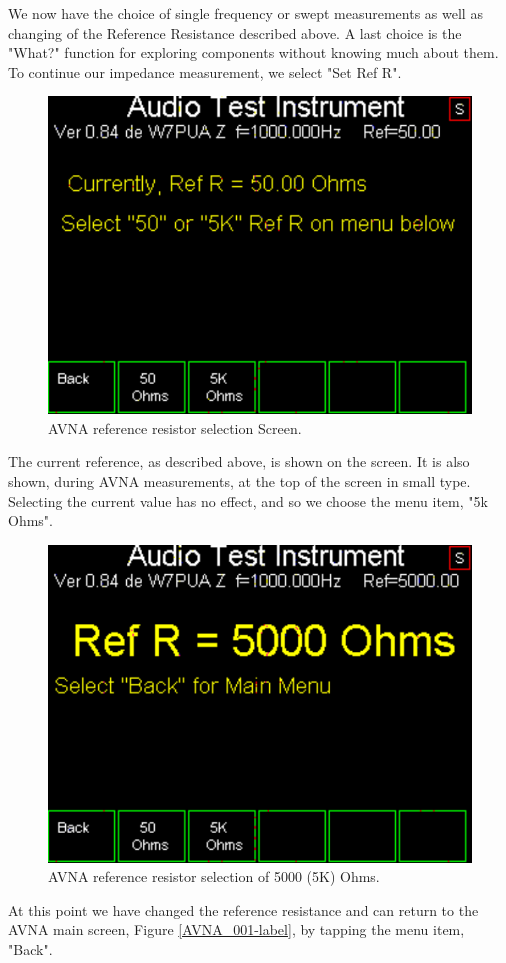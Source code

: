 %
We now have the choice  of single frequency or swept measurements as well as changing of the Reference Resistance described above. A last choice is the "What?" function for exploring components without knowing much about them. To continue our impedance measurement, we select "\textsf{Set Ref R}".
\begin{figure}[H]
\begin{center}
\includegraphics[scale=0.75]{./images/AVNA_003.pdf}
\caption{AVNA reference resistor selection  Screen.}
\label{AVNA_003-label}
\end{center}
\end{figure}
%
The current reference, as described above, is shown on the screen. It is also shown, during AVNA measurements, at the top of the screen in small type. Selecting the current value has no effect, and so we choose the menu item, "\textsf{5k Ohms}".
\begin{figure}[H]
\begin{center}
\includegraphics[scale=0.75]{./images/AVNA_004.pdf}
\caption{AVNA reference resistor selection of 5000 (5K) Ohms.}
\label{AVNA_004-label}
\end{center}
\end{figure}
At this point we have changed the reference resistance and can return to the AVNA main screen, Figure \ref{AVNA_001-label}, by tapping the menu item, "\textsf{Back}".

